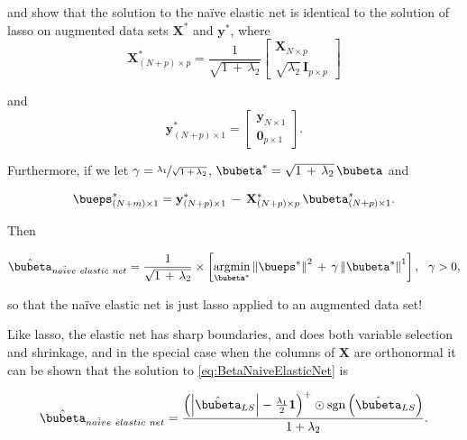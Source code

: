 \documentclass[graybox,envcountchap,sectrefs]{svmono}\usepackage[]{graphicx}\usepackage[]{xcolor}
\begin{document}
\begin{appendices}
and \citet{ZouHastie2005} show that the solution to the na\"{i}ve\emph{
}elastic net is identical to the solution of lasso on augmented data
sets $\mathrm{\mathbf{X}}^{*}$ and $\mathrm{\mathbf{y}}^{*}$, where\\
\begin{equation}
\mathrm{\mathbf{X}}_{(N+p)\times p}^{*}=\frac{1}{\sqrt{1\,+\,\lambda_{2}}}\left[\begin{array}{c}
\mathrm{\mathbf{X}}_{N\times p}\\
\sqrt{\lambda_{2}}\,\mathrm{\mathbf{I}}_{p\times p}
\end{array}\right]\label{eq:Xstar}
\end{equation}

and\\
\begin{equation}
\mathrm{\mathbf{y}}_{(N+p)\times1}^{*}=\left[\begin{array}{c}
\mathrm{\mathbf{y}}_{N\times1}\\
\mathrm{\mathbf{0}}_{p\times1}
\end{array}\right].\label{eq:ystar}
\end{equation}

Furthermore, if we let $\gamma=\nicefrac{\lambda_{1}}{\sqrt{1\,+\,\lambda_{2}}}$,
$\bubeta^{*}=\sqrt{1\,+\,\lambda_{2}}\,\bubeta$ and 

\begin{equation}
\bueps_{(N+m)\times1}^{*}=\mathrm{\mathbf{y}}_{(N+p)\times1}^{*}\,-\,\mathrm{\mathbf{X}}_{(N+p)\times p}^{*}\,\bubeta_{(N+p)\times1}^{*}.\label{eq:EpsilonStar}
\end{equation}

Then 

\begin{equation}
\hat{\bubeta}_{na\ddot{i}ve\ elastic\ net}=\frac{1}{\sqrt{1\,+\,\lambda_{2}}}\times\left[\underset{\bubeta^{*}}{\mathrm{argmin}}\left\Vert \bueps^{*}\right\Vert ^{2}\,+\,\gamma\left\Vert \bubeta^{*}\right\Vert ^{1}\right],\ \ \gamma>0,\label{eq:BetaNaiveElasticNet}
\end{equation}

so that the na\"{i}ve elastic net is just lasso applied to an augmented
data set! 

Like lasso, the elastic net has sharp boundaries, and does both variable
selection and shrinkage, and in the special case when the columns
of $\mathbf{X}$ are orthonormal it can be shown that the solution
to \eqref{eq:BetaNaiveElasticNet} is 

\begin{equation}
\hat{\bubeta}_{na\ddot{i}ve\ elastic\ net}=\frac{\left(\left|\hat{\bubeta}_{LS}\right|-\frac{\lambda_{1}}{2}\boldsymbol{1}\right)^{+}\odot\mathrm{sgn}\left(\hat{\bubeta}_{LS}\right)}{1+\lambda_{2}}.\label{eq:ElasticNetvsLSbeta}
\end{equation}


\end{appendices}
\end{document}

